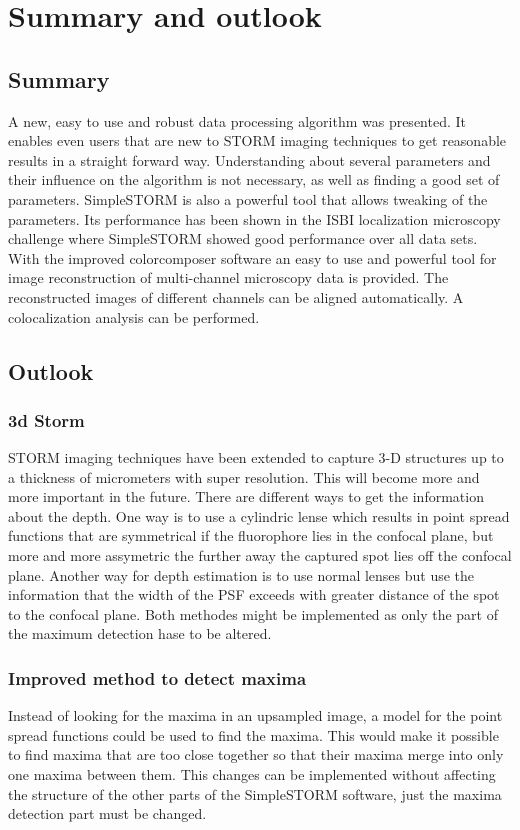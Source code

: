 \chapter{Summary and outlook}
\section{Summary}
A new, easy to use and robust data processing algorithm was presented. It enables even users that are new to STORM imaging techniques to get reasonable results in a straight forward way. Understanding about several parameters and their influence on the algorithm is not necessary, as well as finding a good set of parameters.\newline
SimpleSTORM is also a powerful tool that allows tweaking of the parameters. Its performance has been shown in the ISBI localization microscopy challenge where SimpleSTORM showed good performance over all data sets.\newline
With the improved colorcomposer software an easy to use and powerful tool for image reconstruction of multi-channel microscopy data is provided. The reconstructed images of different channels can be aligned automatically. A colocalization analysis can be performed.
\section{Outlook}
\subsection*{3d Storm}
STORM imaging techniques have been extended to capture 3-D structures up to a thickness of micrometers with super resolution. This will become more and more important in the future. There are different ways to get the information about the depth. One way is to use a cylindric lense which results in point spread functions that are symmetrical if the fluorophore lies in the confocal plane, but more and more assymetric the further away the captured spot lies off the confocal plane.\newline
Another way for depth estimation is to use normal lenses but use the information that the width of the PSF exceeds with greater distance of the spot to the confocal plane.\newline
Both methodes might be implemented as only the part of the maximum detection hase to be altered.
\subsection*{Improved method to detect maxima}
Instead of looking for the maxima in an upsampled image, a model for the point spread functions could be used to find the maxima. This would make it possible to find maxima that are too close together so that their maxima merge into only one maxima between them.\newline
This changes can be implemented without affecting the structure of the other parts of the SimpleSTORM software, just the maxima detection part must be changed.

